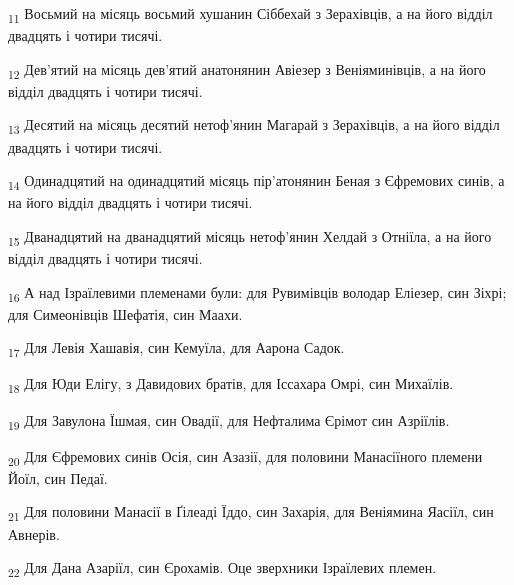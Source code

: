 \begin{tcolorbox}
\textsubscript{11} Восьмий на місяць восьмий хушанин Сіббехай з Зерахівців, а на його відділ двадцять і чотири тисячі.
\end{tcolorbox}
\begin{tcolorbox}
\textsubscript{12} Дев'ятий на місяць дев'ятий анатонянин Авіезер з Веніяминівців, а на його відділ двадцять і чотири тисячі.
\end{tcolorbox}
\begin{tcolorbox}
\textsubscript{13} Десятий на місяць десятий нетоф'янин Магарай з Зерахівців, а на його відділ двадцять і чотири тисячі.
\end{tcolorbox}
\begin{tcolorbox}
\textsubscript{14} Одинадцятий на одинадцятий місяць пір'атонянин Беная з Єфремових синів, а на його відділ двадцять і чотири тисячі.
\end{tcolorbox}
\begin{tcolorbox}
\textsubscript{15} Дванадцятий на дванадцятий місяць нетоф'янин Хелдай з Отніїла, а на його відділ двадцять і чотири тисячі.
\end{tcolorbox}
\begin{tcolorbox}
\textsubscript{16} А над Ізраїлевими племенами були: для Рувимівців володар Еліезер, син Зіхрі; для Симеонівців Шефатія, син Маахи.
\end{tcolorbox}
\begin{tcolorbox}
\textsubscript{17} Для Левія Хашавія, син Кемуїла, для Аарона Садок.
\end{tcolorbox}
\begin{tcolorbox}
\textsubscript{18} Для Юди Елігу, з Давидових братів, для Іссахара Омрі, син Михаїлів.
\end{tcolorbox}
\begin{tcolorbox}
\textsubscript{19} Для Завулона Їшмая, син Овадії, для Нефталима Єрімот син Азріїлів.
\end{tcolorbox}
\begin{tcolorbox}
\textsubscript{20} Для Єфремових синів Осія, син Азазії, для половини Манасіїного племени Йоїл, син Педаї.
\end{tcolorbox}
\begin{tcolorbox}
\textsubscript{21} Для половини Манасії в Ґілеаді Їддо, син Захарія, для Веніямина Яасіїл, син Авнерів.
\end{tcolorbox}
\begin{tcolorbox}
\textsubscript{22} Для Дана Азаріїл, син Єрохамів. Оце зверхники Ізраїлевих племен.
\end{tcolorbox}
